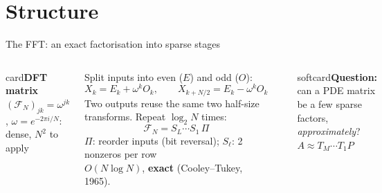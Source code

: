 \documentclass[aspectratio=169,10pt,t]{beamer}
\newcommand{\defn}[2]{{\color{teal}\bfseries #1}\;\;#2}
\newcommand{\defbox}[1]{\begin{beamercolorbox}[rounded=true,sep=.8ex]{card}\scriptsize #1\end{beamercolorbox}}
\newcommand{\punch}[1]{\begin{beamercolorbox}[rounded=true,sep=1ex]{softcard}\centering\small #1\end{beamercolorbox}}
\begin{document}
\section{Structure}

\begin{frame}{The FFT: an exact factorisation into sparse stages}\label{s:fft}
\begin{columns}[T,onlytextwidth]
\small
\defbox{\defn{DFT matrix}{$(\mathcal F_N)_{jk}=\omega^{jk}$, \;$\omega=e^{-2\pi i/N}$: dense, $N^2$ to apply}}
\vspace{2mm}
Split inputs into even ($E$) and odd ($O$):
\[X_k=E_k+\omega^kO_k,\qquad X_{k+N/2}=E_k-\omega^kO_k\]
Two outputs reuse the same two half-size transforms. Repeat $\log_2N$ times:
\[\mathcal F_N=S_L\cdots S_1\,\Pi\]
{\scriptsize\color{muted}$\Pi$: reorder inputs (bit reversal);\; $S_\ell$: 2 nonzeros per row}\\[2mm]
$O(N\log N)$, \textbf{exact} (Cooley--Tukey, 1965).
\begin{center}
\end{center}
\vspace{2mm}
\punch{\textbf{Question:} can a PDE matrix be a few sparse factors, \emph{approximately}?\\[.5mm] $A\approx T_M\cdots T_1P$}
\end{columns}
\end{frame}
\end{document}
